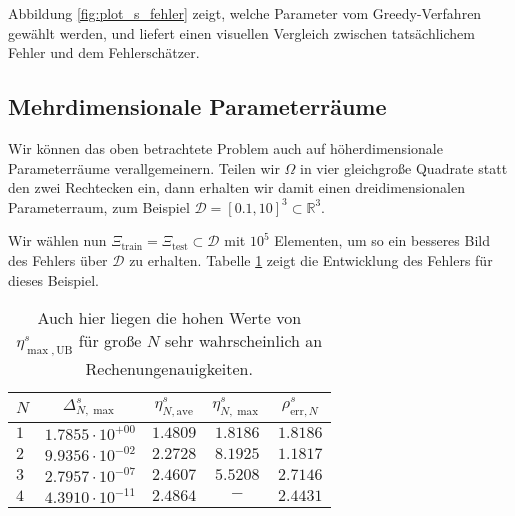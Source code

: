 Abbildung \ref{fig:plot_s_fehler} zeigt, welche Parameter vom Greedy-Verfahren gewählt werden, und liefert einen visuellen Vergleich zwischen tatsächlichem Fehler und dem Fehlerschätzer.

\subsection{Mehrdimensionale Parameterräume} %
\label{sub:mehrdimensionale_parameterr_ume}

Wir können das oben betrachtete Problem auch auf höherdimensionale Parameterräume verallgemeinern. Teilen wir $\Omega$ in vier gleichgroße Quadrate statt den zwei Rechtecken ein, dann erhalten wir damit einen dreidimensionalen Parameterraum, zum Beispiel $\mathcal D = [0.1, 10]^3 \subset \mathbb{R}^3$.

Wir wählen nun $\Xi_\text{train} = \Xi_\text{test} \subset \mathcal D$ mit $10^5$ Elementen, um so ein besseres Bild des Fehlers über $\mathcal D$ zu erhalten. Tabelle \ref{tab:dreidim} zeigt die Entwicklung des Fehlers für dieses Beispiel.

\begin{table}[h]
    \begin{center}
        \begin{tabular}{l|cccc}
        $N$ & $\Delta^s_{N,\max}$ & $\eta^s_{N,\text{ave}}$ & $\eta^s_{N,\max}$ & $\rho^s_{\text{err}, N}$ \\
        \hline
            $1$ & $1.7855 \cdot 10^{+00}$ & $1.4809$ & $1.8186$ & $1.8186$ \\
            $2$ & $9.9356 \cdot 10^{-02}$ & $2.2728$ & $8.1925$ & $1.1817$ \\
            $3$ & $2.7957 \cdot 10^{-07}$ & $2.4607$ & $5.5208$ & $2.7146$ \\
            $4$ & $4.3910 \cdot 10^{-11}$ & $2.4864$ & $-$ & $2.4431$ \\
        \end{tabular}
        \caption{Auch hier liegen die hohen Werte von $\eta^s_{\max,\text{UB}}$ für große $N$ sehr wahrscheinlich an Rechenungenauigkeiten.}
        \label{tab:dreidim}
    \end{center}
\end{table}



